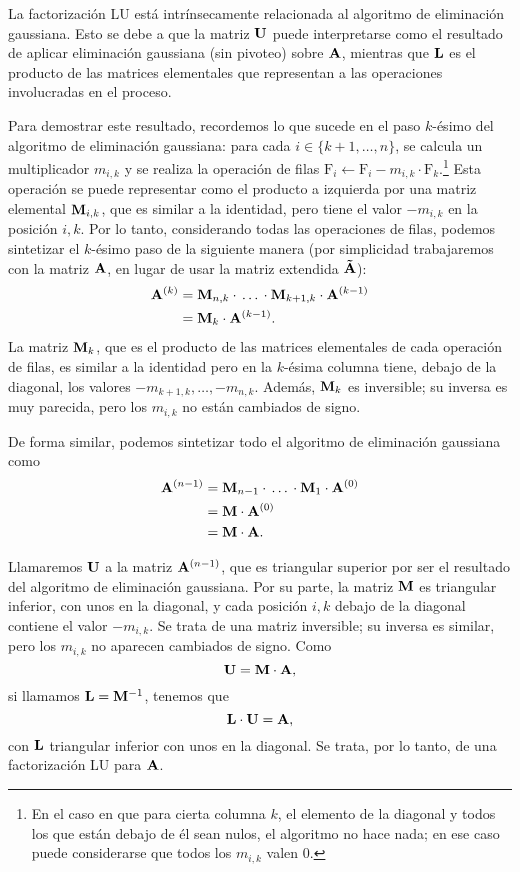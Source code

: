 La factorización LU está intrínsecamente relacionada al algoritmo de
eliminación gaussiana.
Esto se debe a que la matriz $\mathbf{U}$ puede interpretarse como el resultado
de aplicar eliminación gaussiana (sin pivoteo) sobre $\mathbf{A}$, mientras
que $\mathbf{L}$ es el producto de las matrices elementales que representan a
las operaciones involucradas en el proceso.

Para demostrar este resultado, recordemos lo que sucede en el paso $k$-ésimo
del algoritmo de eliminación gaussiana: para cada $i \in \{k+1,\dots,n\}$, se
calcula un multiplicador $m_{i,k}$ y se realiza la operación de filas
$\mathrm{F}_i \gets \mathrm{F}_i - m_{i,k} \cdot \mathrm{F}_k$.\footnote{En el
caso en que para cierta columna $k$, el elemento de la diagonal y todos los
que están debajo de él sean nulos, el algoritmo no hace nada; en ese caso
puede considerarse que todos los $m_{i,k}$ valen $0$.} Esta operación se puede
representar como el producto a izquierda por una matriz elemental
$\mathbf{M}_{i,k}$, que es similar a la identidad, pero tiene el valor $-m_{i,k}$
en la posición $i,k$. Por lo tanto, considerando todas las operaciones de
filas, podemos sintetizar el $k$-ésimo paso de la siguiente manera (por
simplicidad trabajaremos con la matriz $\mathbf{A}$, en lugar de usar la matriz
extendida $\mathbf{\tilde A}$):
\[ \begin{aligned}
    \mathbf{A}^{(k)}
    &= \mathbf{M}_{n,k} \cdot \, \dots \, \cdot \mathbf{M}_{k+1,k} \cdot
        \mathbf{A}^{(k-1)} \\
    &= \mathbf{M}_{k} \cdot \mathbf{A}^{(k-1)}.
\end{aligned} \]
La matriz $\mathbf{M}_{k}$, que es el producto de las matrices elementales
de cada operación de filas, es similar a la identidad pero en la $k$-ésima
columna tiene, debajo de la diagonal, los valores
$-m_{k+1,k}, \dots, -m_{n,k}$. Además, $\mathbf{M}_{k}$ es inversible; su inversa
es muy parecida, pero los $m_{i,k}$ no están cambiados de signo.

De forma similar, podemos sintetizar todo el algoritmo de eliminación
gaussiana como
\[ \begin{aligned}
    \mathbf{A}^{(n-1)}
    &= \mathbf{M}_{n-1} \cdot \, \dots \, \cdot \mathbf{M}_{1} \cdot
        \mathbf{A}^{(0)} \\
    &= \mathbf{M} \cdot \mathbf{A}^{(0)} \\
    &= \mathbf{M} \cdot \mathbf{A}.
\end{aligned} \]

Llamaremos $\mathbf{U}$ a la matriz $\mathbf{A}^{(n-1)}$, que es triangular superior
por ser el resultado del algoritmo de eliminación gaussiana. Por su parte,
la matriz $\mathbf{M}$ es triangular inferior, con unos en la diagonal, y
cada posición $i,k$ debajo de la diagonal contiene el valor $-m_{i,k}$. Se
trata de una matriz inversible; su inversa es similar, pero los $m_{i,k}$
no aparecen cambiados de signo. Como
\[ \mathbf{U} = \mathbf{M} \cdot \mathbf{A}, \]
si llamamos $\mathbf{L} = \mathbf{M}^{-1}$, tenemos que
\[ \mathbf{L} \cdot \mathbf{U} = \mathbf{A}, \]
con $\mathbf{L}$ triangular inferior con unos en la diagonal. Se trata, por lo
tanto, de una factorización LU para $\mathbf{A}$.

